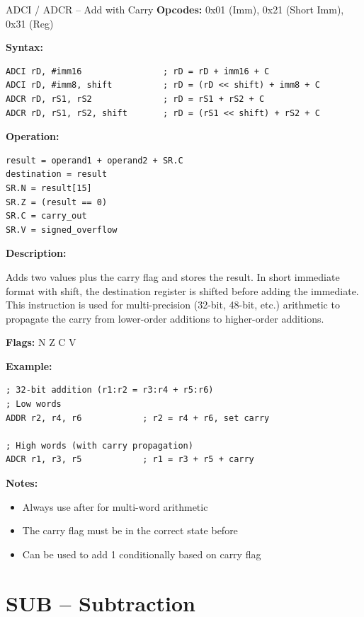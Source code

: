 \begin{instructionbox}{ADCI / ADCR -- Add with Carry}
	\textbf{Opcodes:} 0x01 (Imm), 0x21 (Short Imm), 0x31 (Reg)

	\textbf{Syntax:}
	\begin{lstlisting}
ADCI rD, #imm16                ; rD = rD + imm16 + C
ADCI rD, #imm8, shift          ; rD = (rD << shift) + imm8 + C
ADCR rD, rS1, rS2              ; rD = rS1 + rS2 + C
ADCR rD, rS1, rS2, shift       ; rD = (rS1 << shift) + rS2 + C
\end{lstlisting}

	\textbf{Operation:}
	\begin{verbatim}
result = operand1 + operand2 + SR.C
destination = result
SR.N = result[15]
SR.Z = (result == 0)
SR.C = carry_out
SR.V = signed_overflow
\end{verbatim}

	\textbf{Description:}

	Adds two values plus the carry flag and stores the result. In short immediate format with shift, the destination
	register is shifted before adding the immediate. This instruction is used for multi-precision (32-bit, 48-bit, etc.)
	arithmetic to propagate the carry from lower-order additions to higher-order additions.

	\textbf{Flags:} N Z C V

	\textbf{Example:}
	\begin{lstlisting}
; 32-bit addition (r1:r2 = r3:r4 + r5:r6)
; Low words
ADDR r2, r4, r6            ; r2 = r4 + r6, set carry

; High words (with carry propagation)
ADCR r1, r3, r5            ; r1 = r3 + r5 + carry
\end{lstlisting}

	\textbf{Notes:}
	\begin{itemize}
		\item Always use after  for multi-word arithmetic
		\item The carry flag must be in the correct state before 
		\item Can be used to add 1 conditionally based on carry flag
	\end{itemize}
\end{instructionbox}

\section{SUB -- Subtraction}

